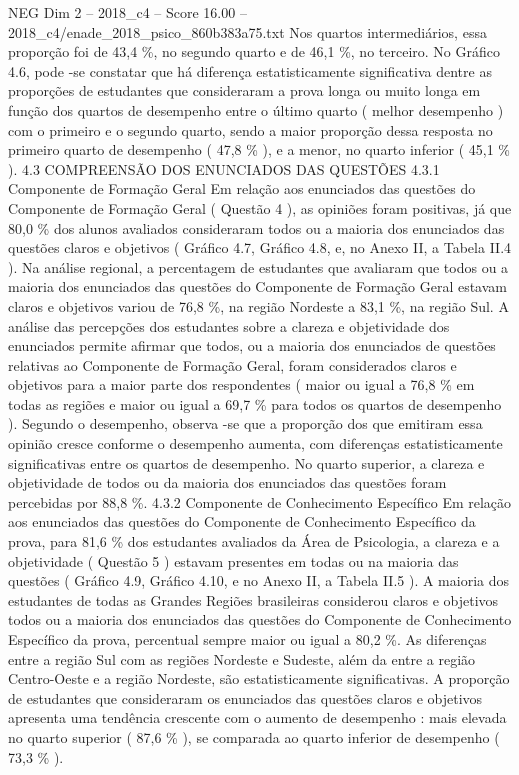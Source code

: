 \begin{textsample}{NEG Dim 2 – 2018\_c4 – Score 16.00 – 2018\_c4/enade\_2018\_psico\_860b383a75.txt}
Nos quartos intermediários, essa proporção foi de 43,4 \%, no segundo quarto e de 46,1 \%, no terceiro.
No Gráfico 4.6, pode -se constatar que há diferença estatisticamente significativa dentre as proporções de estudantes que consideraram a prova longa ou muito longa em função dos quartos de desempenho entre o último quarto ( melhor desempenho ) com o primeiro e o segundo quarto, sendo a maior proporção dessa resposta no primeiro quarto de desempenho ( 47,8 \% ), e a menor, no quarto inferior ( 45,1 \% ). 4.3 COMPREENSÃO DOS ENUNCIADOS DAS QUESTÕES 4.3.1 Componente de Formação Geral Em relação aos enunciados das questões do Componente de Formação Geral ( Questão 4 ), as opiniões foram positivas, já que 80,0 \% dos alunos avaliados consideraram todos ou a maioria dos enunciados das questões claros e objetivos ( Gráfico 4.7, Gráfico 4.8, e, no Anexo II, a Tabela II.4 ).
Na análise regional, a percentagem de estudantes que avaliaram que todos ou a maioria dos enunciados das questões do Componente de Formação Geral estavam claros e objetivos variou de 76,8 \%, na região Nordeste a 83,1 \%, na região Sul.
A análise das percepções dos estudantes sobre a clareza e objetividade dos enunciados permite afirmar que todos, ou a maioria dos enunciados de questões relativas ao Componente de Formação Geral, foram considerados claros e objetivos para a maior parte dos respondentes ( maior ou igual a 76,8 \% em todas as regiões e maior ou igual a 69,7 \% para todos os quartos de desempenho ).
Segundo o desempenho, observa -se que a proporção dos que emitiram essa opinião cresce conforme o desempenho aumenta, com diferenças estatisticamente significativas entre os quartos de desempenho.
No quarto superior, a clareza e objetividade de todos ou da maioria dos enunciados das questões foram percebidas por 88,8 \%. 4.3.2 Componente de Conhecimento Específico Em relação aos enunciados das questões do Componente de Conhecimento Específico da prova, para 81,6 \% dos estudantes avaliados da Área de Psicologia, a clareza e a objetividade ( Questão 5 ) estavam presentes em todas ou na maioria das questões ( Gráfico 4.9, Gráfico 4.10, e no Anexo II, a Tabela II.5 ).
A maioria dos estudantes de todas as Grandes Regiões brasileiras considerou claros e objetivos todos ou a maioria dos enunciados das questões do Componente de Conhecimento Específico da prova, percentual sempre maior ou igual a 80,2 \%.
As diferenças entre a região Sul com as regiões Nordeste e Sudeste, além da entre a região Centro-Oeste e a região Nordeste, são estatisticamente significativas.
A proporção de estudantes que consideraram os enunciados das questões claros e objetivos apresenta uma tendência crescente com o aumento de desempenho : mais elevada no quarto superior ( 87,6 \% ), se comparada ao quarto inferior de desempenho ( 73,3 \% ).

\end{textsample}
